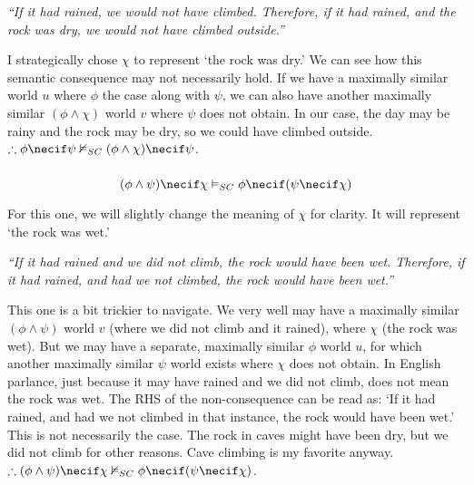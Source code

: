 \documentclass{article}
\begin{document}
            \begin{center}
                \textit{``If it had rained, we would not have climbed. Therefore, if it had rained, and the rock was dry, we would not have climbed outside.''}
            \end{center}

            I strategically chose $\chi$ to represent `the rock was dry.' We can see how this semantic consequence may not necessarily hold.
            If we have a maximally similar world $u$ where $\phi$ the case along with $\psi$, we can also have another maximally similar $(\phi \wedge \chi)$ world $v$ where $\psi$ does not obtain. 
            In our case, the day may be rainy and the rock may be dry, so we could have climbed outside.
            $\therefore \phi \necif \psi \nvDash_{SC} (\phi \wedge \chi) \necif \psi$.

            \subsubsection{}
            $$(\phi \wedge \psi) \necif \chi \vDash_{SC} \phi \necif (\psi \necif \chi)$$

            For this one, we will slightly change the meaning of $\chi$ for clarity. It will represent `the rock was wet.'
            \begin{center}
                \textit{``If it had rained and we did not climb, the rock would have been wet.
                Therefore, if it had rained, and had we not climbed, the rock would have been wet.''}
            \end{center}

            This one is a bit trickier to navigate. We very well may have a maximally similar $(\phi \wedge \psi)$ world $v$ (where we did not climb and it rained), where $\chi$ (the rock was wet).
            But we may have a separate, maximally similar $\phi$ world $u$, for which another maximally similar $\psi$ world exists where $\chi$ does not obtain.
            In English parlance, just because it may have rained and we did not climb, does not mean the rock was wet. The RHS of the non-consequence can be read as: `If it had rained, and had we not climbed in that instance, the rock would have been wet.' This is not necessarily the case.
            The rock in caves might have been dry, but we did not climb for other reasons. Cave climbing is my favorite anyway.
            $\therefore (\phi \wedge \psi) \necif \chi \nvDash_{SC} \phi \necif (\psi \necif \chi)$.
\end{document}
